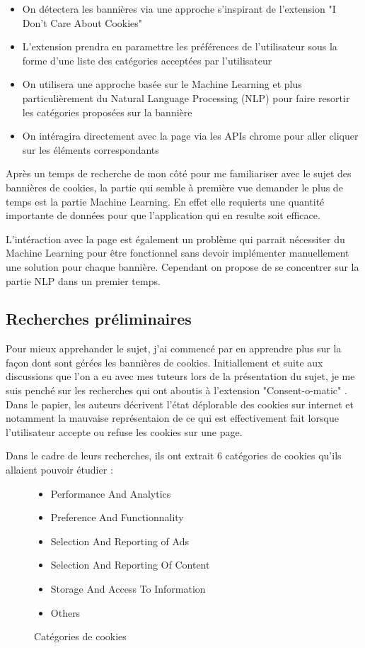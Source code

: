 \documentclass[oneside,a4paper,12pt]{article}
\begin{document}
	\begin{itemize}
		\item On détectera les bannières via une approche s'inspirant de l'extension "I Don't Care About Cookies"
		\item L'extension prendra en paramettre les préférences de l'utilisateur sous la forme d'une liste des catégories acceptées par l'utilisateur
		\item On utilisera une approche basée sur le Machine Learning et plus particulièrement du Natural Language Processing (NLP) pour faire resortir les catégories proposées sur la bannière
		\item On intéragira directement avec la page via les APIs chrome pour aller cliquer sur les éléments correspondants
	\end{itemize}

	Après un temps de recherche de mon côté pour me familiariser avec le sujet des bannières de cookies, la partie qui semble à première vue demander le plus de temps est la partie Machine Learning. En effet elle requierts une quantité importante de données pour que l'application qui en resulte soit efficace.
	
	L'intéraction avec la page est également un problème qui parrait nécessiter du Machine Learning pour être fonctionnel sans devoir implémenter manuellement une solution pour chaque bannière. Cependant on propose de se concentrer sur la partie NLP dans un premier temps.
	
	\subsection{Recherches préliminaires}
	
	Pour mieux apprehander le sujet, j'ai commencé par en apprendre plus sur la façon dont sont gérées les bannières de cookies. 
	Initiallement et suite aux discussions que l'on a eu avec mes tuteurs lors de la présentation du sujet, je me suis penché sur les recherches qui ont aboutis à l'extension "Consent-o-matic" \cite{consentomatic}.
	Dans le papier, les auteurs décrivent l'état déplorable des cookies sur internet et notamment la mauvaise représentaion de ce qui est effectivement fait lorsque l'utilisateur accepte ou refuse les cookies sur une page.
	
	Dans le cadre de leurs recherches, ils ont extrait 6 catégories de cookies qu'ils allaient pouvoir étudier :
	\begin{figure}[h]
		\centering
		\label{categories}
		\begin{itemize}
			\centering
			\item Performance And Analytics
			\item Preference And Functionnality
			\item Selection And Reporting of Ads
			\item Selection And Reporting Of Content
			\item Storage And Access To Information
			\item Others
		\end{itemize}
		\caption{Catégories de cookies}
	\end{figure}
	
\end{document}
